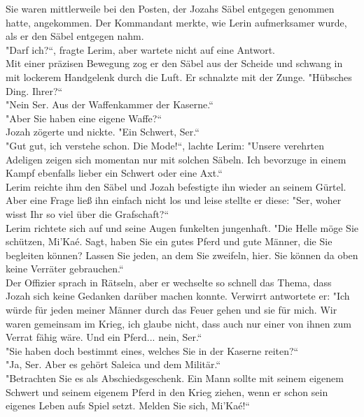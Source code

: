 Sie waren mittlerweile bei den Posten, der Jozahs Säbel entgegen genommen hatte, angekommen. Der 
Kommandant merkte, wie Lerin aufmerksamer wurde, als er den Säbel entgegen nahm.\\
"Darf ich?``, fragte Lerim, aber wartete nicht auf eine Antwort.\\
Mit einer präzisen Bewegung zog er den Säbel aus der Scheide und schwang in mit lockerem Handgelenk 
durch die Luft. Er schnalzte mit der Zunge. "Hübsches Ding. Ihrer?``\\
"Nein Ser. Aus der Waffenkammer der Kaserne.``\\
"Aber Sie haben eine eigene Waffe?``\\
Jozah zögerte und nickte. "Ein Schwert, Ser.``\\
"Gut gut, ich verstehe schon. Die Mode!``, lachte Lerim: "Unsere verehrten Adeligen zeigen sich 
momentan nur mit solchen Säbeln. Ich bevorzuge in einem Kampf ebenfalls lieber ein Schwert oder 
eine Axt.``\\
Lerim reichte ihm den Säbel und Jozah befestigte ihn wieder an seinem Gürtel. Aber eine Frage ließ 
ihn einfach nicht los und leise stellte er diese: "Ser, woher wisst Ihr so viel über die 
Grafschaft?``\\
Lerim richtete sich auf und seine Augen funkelten jungenhaft. "Die Helle möge Sie schützen, Mi'Kaé. 
Sagt, haben Sie ein gutes Pferd und gute Männer, die Sie begleiten  können? Lassen Sie jeden, an 
dem Sie zweifeln, hier. Sie können da oben keine Verräter gebrauchen.``\\
Der Offizier sprach in Rätseln, aber er wechselte so schnell das Thema, dass Jozah sich keine 
Gedanken darüber machen konnte. Verwirrt antwortete er: "Ich würde für jeden meiner Männer durch 
das Feuer gehen und sie für mich. Wir waren gemeinsam im Krieg, ich glaube nicht, dass auch nur 
einer von ihnen zum Verrat fähig wäre. Und ein Pferd... nein, Ser.``\\
"Sie haben doch bestimmt eines, welches Sie in der Kaserne reiten?``\\
"Ja, Ser. Aber es gehört Saleica und dem Militär.``\\
"Betrachten Sie es als Abschiedsgeschenk. Ein Mann sollte mit seinem eigenem Schwert und seinem 
eigenem Pferd in den Krieg ziehen, wenn er schon sein eigenes Leben aufs Spiel setzt. Melden Sie 
sich, Mi'Kaé!`` \\
